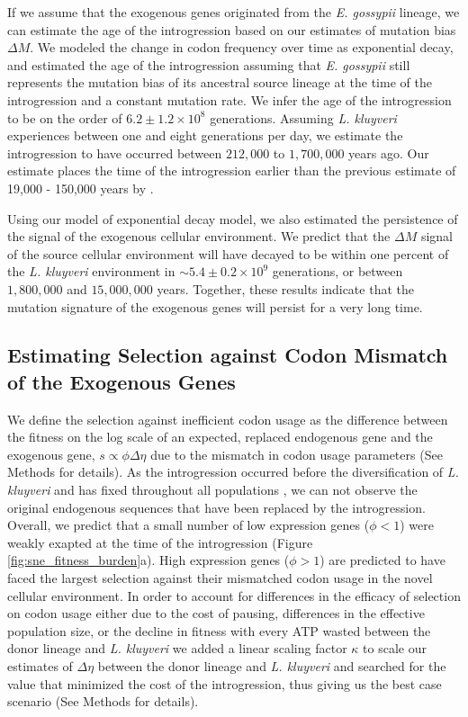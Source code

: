 \documentclass[doublespacing,linenumbers]{bmcart}
\newcommand{\kluyveri}{\textit{L. kluyveri}\xspace}
\newcommand{\gossypii}{\textit{E. gossypii}\xspace}
\newcommand{\DM}{\ensuremath{{\Delta M}}\xspace}
\newcommand{\DE}{\ensuremath{{\Delta \eta}}\xspace}
\begin{document}
If we assume that the exogenous genes originated from the \gossypii lineage, we can estimate the age of the introgression based on our estimates of mutation bias \DM.
We modeled the change in codon frequency over time as exponential decay, and estimated the age of the introgression assuming that \gossypii still represents the mutation bias of its ancestral source lineage at the time of the introgression and a constant mutation rate.
We infer the age of the introgression to be on the order of $6.2\pm1.2\times 10^8$ generations. 
Assuming \kluyveri experiences between one and eight generations per day, we estimate the introgression to have occurred between $212,000$ to $1,700,000$ years ago.
Our estimate places the time of the introgression earlier than the previous estimate of 19,000 - 150,000 years by \cite{friedrich2015}.

Using our model of exponential decay model, we also estimated the persistence of the signal of the exogenous cellular environment.
We predict that the \DM signal of the source cellular environment will have decayed to be within one percent of the \kluyveri environment in $\sim 5.4\pm0.2\times 10^9 $ generations, or between $1,800,000$ and $15,000,000$ years.
Together, these results indicate that the mutation signature of the exogenous genes will persist for a very long time.

\subsection*{Estimating Selection against Codon Mismatch of the Exogenous Genes}

We define the selection against inefficient codon usage as the difference between the fitness on the log scale of an expected, replaced endogenous gene and the exogenous gene, $s \propto \phi \DE$ due to the mismatch in codon usage parameters (See Methods for details).
As the introgression occurred before the diversification of \kluyveri and has fixed throughout all populations \citep{friedrich2015}, we can not observe the original endogenous sequences that have been replaced by the introgression.
Overall, we predict that a small number of low expression genes ($\phi < 1$) were weakly exapted at the time of the introgression (Figure \ref{fig:sne_fitness_burden}a).
High expression genes ($\phi > 1$) are predicted to have faced the largest selection against their mismatched codon usage in the novel cellular environment.
In order to account for differences in the efficacy of selection on codon usage either due to the cost of pausing, differences in the effective population size, or the decline in fitness with every ATP wasted between the donor lineage and \kluyveri we added a linear scaling factor $\kappa$ to scale our estimates of \DE between the donor lineage and \kluyveri and searched for the value that minimized the cost of the introgression, thus giving us the best case scenario (See Methods for details).
\end{document}
